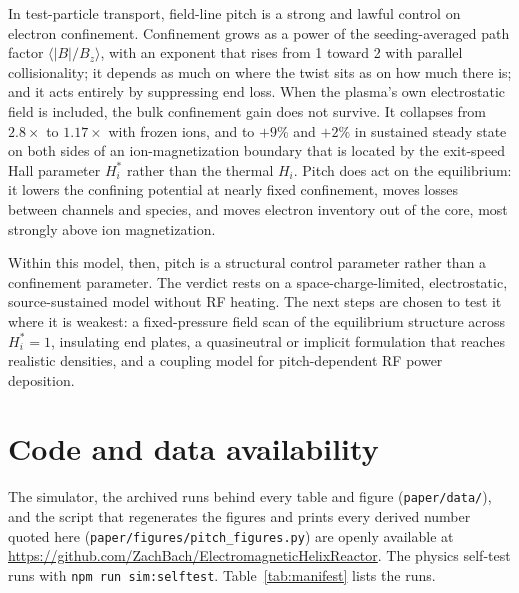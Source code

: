 \documentclass[11pt]{article}
\begin{document}
In test-particle transport, field-line pitch is a strong and lawful control on electron confinement. Confinement grows as a power of the seeding-averaged path factor $\langle|B|/B_z\rangle$, with an exponent that rises from 1 toward 2 with parallel collisionality; it depends as much on where the twist sits as on how much there is; and it acts entirely by suppressing end loss. When the plasma's own electrostatic field is included, the bulk confinement gain does not survive. It collapses from $2.8\times$ to $1.17\times$ with frozen ions, and to $+9\%$ and $+2\%$ in sustained steady state on both sides of an ion-magnetization boundary that is located by the exit-speed Hall parameter $H_i^*$ rather than the thermal $H_i$. Pitch does act on the equilibrium: it lowers the confining potential at nearly fixed confinement, moves losses between channels and species, and moves electron inventory out of the core, most strongly above ion magnetization.

Within this model, then, pitch is a structural control parameter rather than a confinement parameter. The verdict rests on a space-charge-limited, electrostatic, source-sustained model without RF heating. The next steps are chosen to test it where it is weakest: a fixed-pressure field scan of the equilibrium structure across $H_i^* = 1$, insulating end plates, a quasineutral or implicit formulation that reaches realistic densities, and a coupling model for pitch-dependent RF power deposition.


\section*{Code and data availability}

\begin{sloppypar}
The simulator, the archived runs behind every table and figure (\texttt{paper/data/}), and the script that regenerates the figures and prints every derived number quoted here (\texttt{paper/figures/pitch\_figures.py}) are openly available at \url{https://github.com/ZachBach/ElectromagneticHelixReactor}. The physics self-test runs with \texttt{npm run sim:selftest}. Table~\ref{tab:manifest} lists the runs.
\end{sloppypar}
\end{document}
